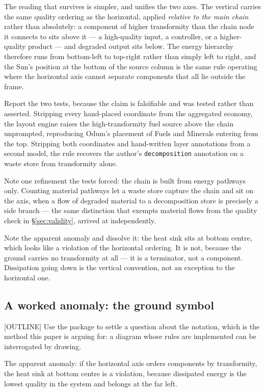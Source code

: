The reading that survives is simpler, and unifies the two axes. The vertical
carries the same quality ordering as the horizontal, applied \emph{relative to
the main chain} rather than absolutely: a component of higher transformity than
the chain node it connects to sits above it --- a high-quality input, a
controller, or a higher-quality product --- and degraded output sits below. The
energy hierarchy therefore runs from bottom-left to top-right rather than simply
left to right, and the Sun's position at the bottom of the source column is the
same rule operating where the horizontal axis cannot separate components that
all lie outside the frame.

Report the two tests, because the claim is falsifiable and was tested rather
than asserted. Stripping every hand-placed coordinate from the aggregated
economy, the layout engine raises the high-transformity fuel source above the
chain unprompted, reproducing Odum's placement of Fuels and Minerals entering
from the top. Stripping both coordinates and hand-written layer annotations from
a second model, the rule recovers the author's \texttt{decomposition}
annotation on a waste store from transformity alone.

Note one refinement the tests forced: the chain is built from energy pathways
only. Counting material pathways let a waste store capture the chain and sit on
the axis, when a flow of degraded material to a decomposition store is precisely
a side branch --- the same distinction that exempts material flows from the
quality check in \S\ref{sec:validity}, arrived at independently.

Note the apparent anomaly and dissolve it: the heat sink sits at bottom centre,
which looks like a violation of the horizontal ordering. It is not, because the
ground carries no transformity at all --- it is a terminator, not a component.
Dissipation going down is the vertical convention, not an exception to the
horizontal one.

\subsection{A worked anomaly: the ground symbol}
\label{sec:ground}

[OUTLINE] Use the package to settle a question about the notation, which is the
method this paper is arguing for: a diagram whose rules are implemented can be
interrogated by drawing.

The apparent anomaly: if the horizontal axis orders components by transformity,
the heat sink at bottom centre is a violation, because dissipated energy is the
lowest quality in the system and belongs at the far left.

